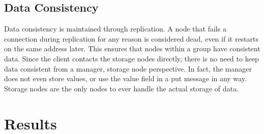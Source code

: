 \documentclass{article}
\begin{document}
\subsection{Data Consistency}
Data consistency is maintained through replication. A node that fails a connection during replication for any reason is considered dead, even if it restarts on the same address later.
This ensures that nodes within a group have consistent data. Since the client contacts the storage nodes directly, there is no need to keep data consistent from a manager, storage node
perspective. In fact, the manager does not even store values, or use the value field in a put message in any way. Storage nodes are the only nodes to ever handle the actual storage of data.
\section{Results}
\end{document}
